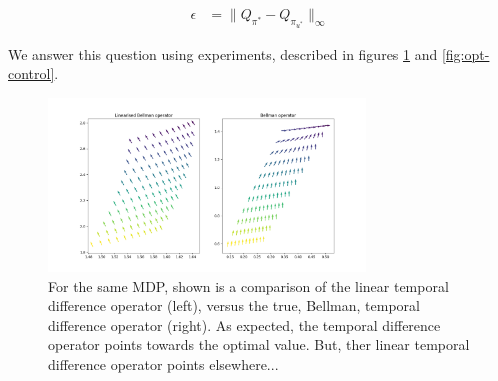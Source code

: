 \begin{align*}
\epsilon &= \parallel Q_{\pi^{* }} - Q_{\pi_{u^{* }}} \parallel_{\infty}
\end{align*}

We answer this question using experiments, described in figures \ref{fig:ltd} and \ref{fig:opt-control}.

\begin{figure}
\centering
\includegraphics[width=0.75\textwidth,height=0.5\textheight]{../../pictures/figures/LBO_BO.png}
\caption{For the same MDP, shown is a comparison of the linear temporal difference operator (left), versus the true, Bellman, temporal difference operator (right). As expected, the temporal difference operator points towards the optimal value. But, ther linear temporal difference operator points elsewhere...}
\label{fig:ltd}
\end{figure}

